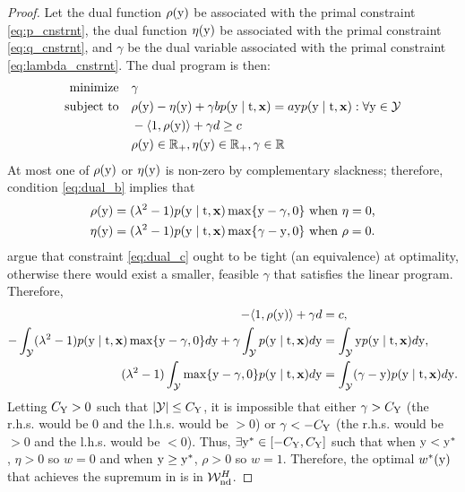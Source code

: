 \begin{lemma}
\begin{proof}
        Let the dual function $\rho(\mathrm{y})$ be associated with the primal constraint \cref{eq:p_cnstrnt}, the dual function $\eta(\mathrm{y})$ be associated with the primal constraint \cref{eq:q_cnstrnt}, and $\gamma$ be the dual variable associated with the primal constraint \cref{eq:lambda_cnstrnt}. 
        The dual program is then:
        \begin{subequations}
            \begin{align}
                \text{minimize}\quad &\gamma \label{eq:dual_a} \\
                \text{subject to}\quad & \rho(\mathrm{y}) - \eta(\mathrm{y}) + \gamma b p(\mathrm{y} \mid \mathrm{t}, \mathbf{x}) = a \mathrm{y} p(\mathrm{y} \mid \mathrm{t}, \mathbf{x}): \forall\mathrm{y} \in \mathcal{Y} \label{eq:dual_b} \\
                & -\langle 1, \rho(\mathrm{y}) \rangle + \gamma d \geq c \label{eq:dual_c} \\
                & \rho(\mathrm{y}) \in \mathbb{R}_+, \eta(\mathrm{y}) \in \mathbb{R}_+, \gamma \in \mathbb{R}
            \end{align}
        \end{subequations}
        At most one of $\rho(\mathrm{y})$ or $\eta(\mathrm{y})$ is non-zero by complementary slackness; therefore, condition \cref{eq:dual_b} implies that
        \begin{equation*}
            \begin{split}
                \rho(\mathrm{y}) &= (\lambda^2 - 1)p(\mathrm{y} \mid \mathrm{t}, \mathbf{x}) \max\{\mathrm{y} - \gamma, 0\} \text{ when $\eta=0$,} \\
                \eta(\mathrm{y}) &= (\lambda^2 - 1)p(\mathrm{y} \mid \mathrm{t}, \mathbf{x}) \max\{\gamma - \mathrm{y}, 0\} \text{ when $\rho=0$.} 
            \end{split}
        \end{equation*}
        \cite{kallus2019interval} argue that constraint \cref{eq:dual_c} ought to be tight (an equivalence) at optimality, otherwise there would exist a smaller, feasible $\gamma$ that satisfies the linear program.
        Therefore,
        \begin{equation}
            \begin{split}
                -\langle 1, \rho(\mathrm{y}) \rangle + \gamma d &= c, \\
                -\int_{\mathcal{Y}} (\lambda^2 - 1)p(\mathrm{y} \mid \mathrm{t}, \mathbf{x}) \max\{\mathrm{y} - \gamma, 0\}d\mathrm{y} + \gamma \int_{\mathcal{Y}} p(\mathrm{y} \mid \mathrm{t}, \mathbf{x}) d\mathrm{y} &=  \int_{\mathcal{Y}} \mathrm{y} p(\mathrm{y} \mid \mathrm{t}, \mathbf{x}) d\mathrm{y}, \\
                (\lambda^2 - 1)\int_{\mathcal{Y}} \max\{\mathrm{y} - \gamma, 0\} p(\mathrm{y} \mid \mathrm{t}, \mathbf{x})d\mathrm{y}  &= \int_{\mathcal{Y}} (\gamma - \mathrm{y}) p(\mathrm{y} \mid \mathrm{t}, \mathbf{x}) d\mathrm{y}.
            \end{split}
        \end{equation}
        Letting $C_{\mathrm{Y}} > 0$ such that $|\mathcal{Y}| \leq C_{\mathrm{Y}}$, it is impossible that either $\gamma > C_{\mathrm{Y}}$ (the r.h.s. would be $0$ and the l.h.s. would be $>0$) or $\gamma < -C_{\mathrm{Y}}$ (the r.h.s. would be $>0$ and the l.h.s. would be $<0$). 
        Thus, $\exists \mathrm{y}^{*} \in [-C_{\mathrm{Y}}, C_{\mathrm{Y}}]$ such that when $\mathrm{y} < \mathrm{y}^{*}$, $\eta > 0$ so $w = 0$ and when $\mathrm{y} \geq \mathrm{y}^{*}$, $\rho > 0$ so $w = 1$. 
        Therefore, the optimal $w^*(\mathrm{y})$ that achieves the supremum in  is in $\mathcal{W}_{\textrm{nd}}^{H}$. 
        

\end{proof}
\end{lemma}
